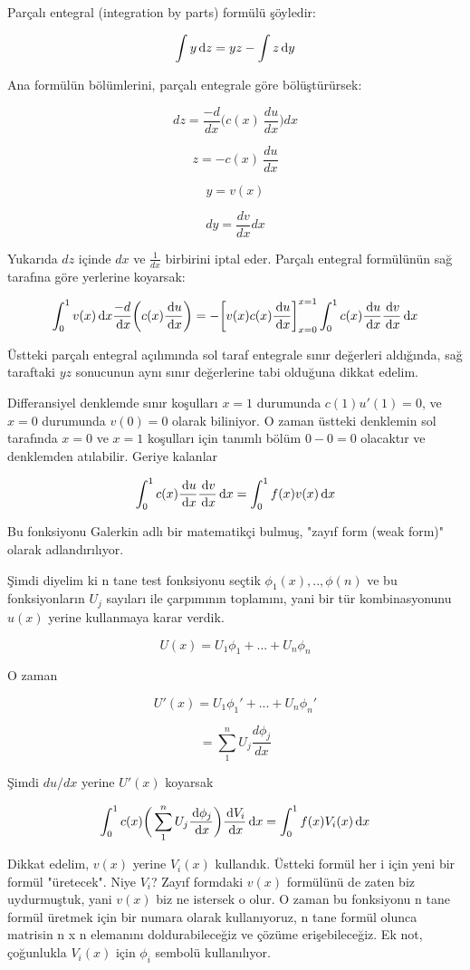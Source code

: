 \documentclass[12pt,fleqn]{article}\usepackage{../../common}
\begin{document}
Parçalı entegral (integration by parts) formülü şöyledir:

$$ \int y \,\mathrm{d} z = y  z - \int z \,\mathrm{d} y $$

Ana formülün bölümlerini, parçalı entegrale göre bölüştürürsek:

$$ dz = \frac{-d}{dx} \bigg( c(x) \ \frac{du}{dx} \bigg) dx  $$

$$ z = - c(x) \ \frac{du}{dx}  $$

$$ y = v(x)  $$

$$ dy = \frac{dv}{dx}dx $$

Yukarıda $dz$ içinde $dx$ ve $\frac{1}{dx}$ birbirini iptal eder. Parçalı
entegral formülünün sağ tarafına göre yerlerine koyarsak:

$$
\int_0^1 v(x)\,\mathrm{d} x \frac{-d}{\,\mathrm{d} x} \bigg( c(x) \frac{\,\mathrm{d} u}{\,\mathrm{d} x} \bigg)
= - \bigg[ v(x) c(x) \frac{\,\mathrm{d} u}{\,\mathrm{d} x} \bigg]_{x=0}^{x=1} \int_0^1 c(x) \frac{\,\mathrm{d} u}{\,\mathrm{d} x} \frac{\,\mathrm{d} v}{\,\mathrm{d} x} \,\mathrm{d} x
$$

Üstteki parçalı entegral açılımında sol taraf entegrale sınır
değerleri aldığında, sağ taraftaki $yz$ sonucunun aynı sınır
değerlerine tabi olduğuna dikkat edelim.

Differansiyel denklemde sınır koşulları $x=1$ durumunda $c(1)u'(1)=0$,
ve $x=0$ durumunda $v(0)=0$ olarak biliniyor. O zaman üstteki
denklemin sol tarafında $x=0$ ve $x=1$ koşulları için tanımlı bölüm $0
- 0 = 0$ olacaktır ve denklemden atılabilir. Geriye kalanlar

$$
\int_0^1 c(x) \frac{\,\mathrm{d} u}{\,\mathrm{d} x} \frac{\,\mathrm{d} v}{\,\mathrm{d} x} \,\mathrm{d} x
= \int_0^1 f(x)v(x) \,\mathrm{d} x
$$

Bu fonksiyonu Galerkin adlı bir matematikçi bulmuş, "zayıf form (weak
form)" olarak adlandırılıyor.

Şimdi diyelim ki n tane test fonksiyonu seçtik $\phi_1(x),..,\phi(n)$
ve bu fonksiyonların $U_j$ sayıları ile çarpımının toplamını, yani bir
tür kombinasyonunu $u(x)$ yerine kullanmaya karar verdik.

$$ U(x) = U_1 \phi_1+ ... + U_n\phi_n $$

O zaman

$$ U'(x) = U_1 \phi_1'+ ... + U_n\phi_n' $$

$$ = \sum_1^n U_j \frac{d\phi_j}{dx} $$

Şimdi $du / dx$ yerine $U'(x)$ koyarsak

$$
\int_0^1 c(x) \bigg( \sum_1^n U_j \frac{\,\mathrm{d}\phi_j}{\,\mathrm{d} x}\bigg)
\frac{\,\mathrm{d} V_i}{\,\mathrm{d} x}\,\mathrm{d} x
= \int_0^1 f(x)V_i(x)\,\mathrm{d} x
$$

Dikkat edelim, $v(x)$ yerine $V_i(x)$ kullandık. Üstteki formül her i için yeni
bir formül "üretecek". Niye $V_i$? Zayıf formdaki $v(x)$ formülünü de zaten biz
uydurmuştuk, yani $v(x)$ biz ne istersek o olur. O zaman bu fonksiyonu n tane
formül üretmek için bir numara olarak kullanıyoruz, n tane formül olunca
matrisin n x n elemanını doldurabileceğiz ve çözüme erişebileceğiz. Ek not,
çoğunlukla $V_i(x)$ için $\phi_i$ sembolü kullanılıyor.
\end{document}

